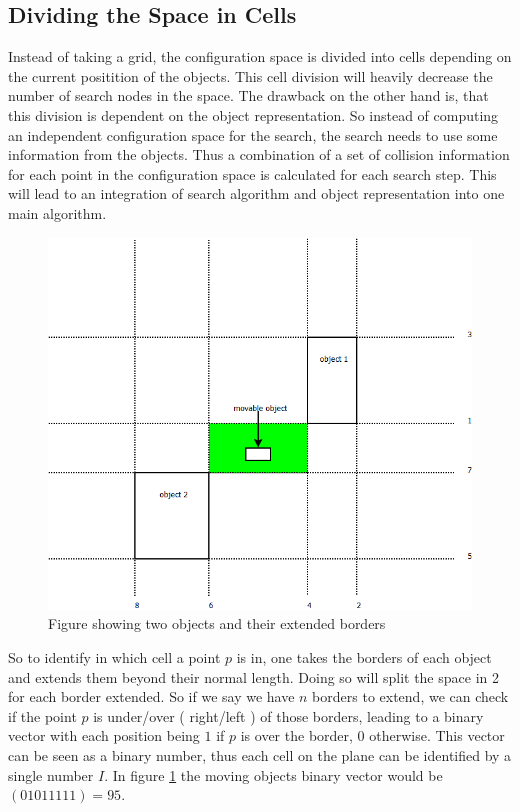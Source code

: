 \subsection{Dividing the Space in Cells}
\label{subsec::cells}
Instead of taking a grid, the configuration space is divided into cells depending on the current positition of the objects. This cell division will heavily decrease the number of search nodes in the space. The drawback on the other hand is, that this division is dependent on the object representation. So instead of computing an independent configuration space for the search, the search needs to use some information from the objects. Thus a combination of a set of collision information for each point in the configuration space is calculated for each search step. This will lead to an integration of search algorithm and object representation into one main algorithm.\\
\begin{figure}[H]
\centering
\includegraphics[scale=0.5]{cellDivision}
\caption{Figure showing two objects and their extended borders}
\label{cellDivision}
\end{figure}
So to identify in which cell a point $p$ is in, one takes the borders of each object and extends them beyond their normal length. Doing so will split the space in 2 for each border extended. So if we say we have $n$ borders to extend, we can check if the point $p$ is under/over ( right/left ) of those borders, leading to a binary vector with each position being $1$ if $p$ is over the border, $0$ otherwise. This vector can be seen as a binary number, thus each cell on the plane can be identified by a single number $I$. In figure \ref{cellDivision} the moving objects binary vector would be $(0 1 0 1 1 1 1 1) =  95$.\\
